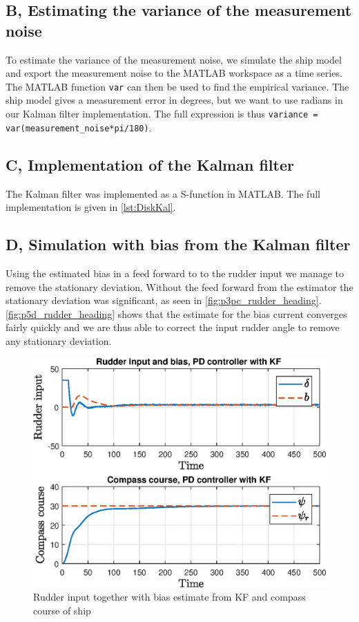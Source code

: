 \subsection{B, Estimating the variance of the measurement noise}
To estimate the variance of the measurement noise, we simulate the ship model and export the measurement noise to the MATLAB workspace as a time series. The MATLAB function \lstinline{var} can then be used to find the empirical variance. The ship model gives a measurement error in degrees, but we want to use radians in our Kalman filter implementation. The full expression is thus \lstinline{variance = var(measurement_noise*pi/180)}.

\subsection{C, Implementation of the Kalman filter}
The Kalman filter was implemented as a S-function in MATLAB. The full implementation is given in \autoref{lst:DiskKal}.

\subsection{D, Simulation with bias from the Kalman filter}
Using the estimated bias in a feed forward to to the rudder input we manage to remove the stationary deviation. Without the feed forward from the estimator the stationary deviation was significant, as seen in \autoref{fig:p3pc_rudder_heading}. \autoref{fig:p5d_rudder_heading} shows that the estimate for the bias current converges fairly quickly and we are thus able to correct the input rudder angle to remove any stationary deviation. 

\begin{figure}
    \centering
    \includegraphics[width = 1.00\textwidth]{figures/plots/P5p5d_rudder_heading.eps}
    \caption{Rudder input together with bias estimate from KF and compass course of ship}
    \label{fig:p5d_rudder_heading}
\end{figure}

